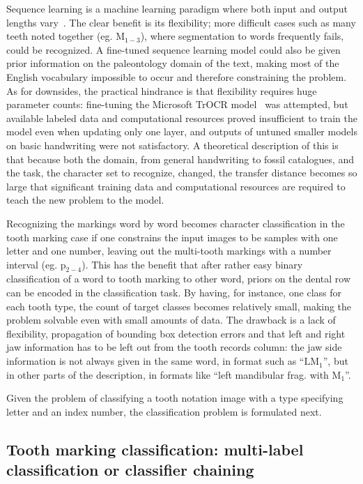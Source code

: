 \documentclass[english,twoside,openright]{UH_DS_MSc}
\begin{document}
Sequence learning is a machine learning paradigm where both input and output lengths vary~\cite{sutskever2014sequence}.
The clear benefit is its flexibility; more difficult cases such as many teeth noted together (eg. $\text{M}_{1-3}$),
where segmentation to words frequently fails, could be recognized. A fine-tuned sequence learning 
model could also be given prior information on the paleontology domain of the text, making
most of the English vocabulary impossible to occur and therefore constraining the problem. As for downsides, the practical hindrance is 
that flexibility requires huge parameter counts: fine-tuning the 
Microsoft TrOCR model~\cite{li2021trocr} was attempted, but available labeled data and computational 
resources proved insufficient to train the model even when updating only one layer,
and outputs of untuned smaller models on basic handwriting were not satisfactory.
A theoretical description of this is that because both the domain, from general handwriting to fossil catalogues, 
and the task, the character set to recognize, changed, the transfer distance becomes so large 
that significant training data and computational resources are required to teach the new problem to the model.

Recognizing the markings word by word becomes character classification in 
the tooth marking case if one constrains the input images to be samples with one letter and 
one number, leaving out the multi-tooth markings with a number interval (eg. $\text{p}_{2-4}$).
This has the benefit that after rather easy binary classification of a word to 
tooth marking to other word, priors on the dental row can be encoded in the classification
task. By having, for instance, one class for each tooth type, the count of target classes becomes
relatively small, making the problem solvable even with small amounts of data.
The drawback is a lack of flexibility, propagation of 
bounding box detection errors and that left and right jaw information has to be left out from 
the tooth records column: the jaw side information is not always given in the same word, 
in format such as ``$\text{LM}_1$'', but in other parts of the description, in formats like
 ``left mandibular frag. with $\text{M}_1$''.

Given the problem of classifying a tooth notation image with a type specifying letter and an index 
number, the classification problem is formulated next.

\subsection{Tooth marking classification: multi-label classification or classifier chaining}
\end{document}
